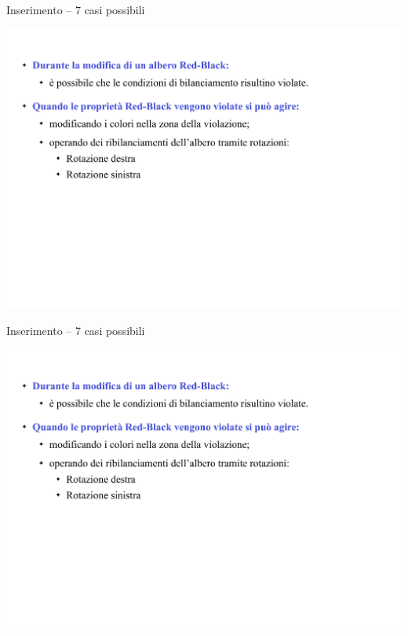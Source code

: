 \begin{frame}{Inserimento -- 7 casi possibili}

\includegraphics[width=1.0\textwidth,page=13]{redblack2.pdf}

\end{frame}

\begin{frame}{Inserimento -- 7 casi possibili}

\includegraphics[width=1.0\textwidth,page=14]{redblack2.pdf}

\end{frame}

